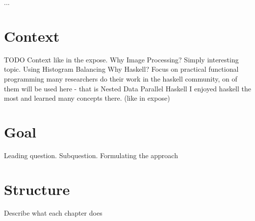
...

\section{Context}
  TODO
  Context like in the expose.
  Why Image Processing? Simply interesting topic. Using Histogram Balancing
  Why Haskell?
    Focus on practical functional programming
    many researchers do their work in the haskell community,
      on of them will be used here - that is Nested Data Parallel Haskell
    I enjoyed haskell the most and learned many concepts there. (like in expose)
\section{Goal}
  Leading question. Subquestion.
  Formulating the approach
\section{Structure}
  Describe what each chapter does
